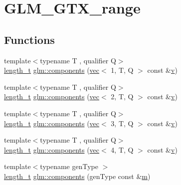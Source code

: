 \hypertarget{group__gtx__range}{}\section{G\+L\+M\+\_\+\+G\+T\+X\+\_\+range}
\label{group__gtx__range}
\subsection*{Functions}
\begin{DoxyCompactItemize}
\item 
{\footnotesize template$<$typename T , qualifier Q$>$ }\\\hyperlink{namespaceglm_a090a0de2260835bee80e71a702492ed9}{length\+\_\+t} \hyperlink{group__gtx__range_gaf2831875a8cee7cc000abadba2aa1265}{glm\+::components} (\hyperlink{structglm_1_1vec}{vec}$<$ 1, T, Q $>$ const \&\hyperlink{_s_d_l__opengl_8h_a10a82eabcb59d2fcd74acee063775f90}{v})
\item 
{\footnotesize template$<$typename T , qualifier Q$>$ }\\\hyperlink{namespaceglm_a090a0de2260835bee80e71a702492ed9}{length\+\_\+t} \hyperlink{group__gtx__range_ga30085e4904149502aac186e95d5604bf}{glm\+::components} (\hyperlink{structglm_1_1vec}{vec}$<$ 2, T, Q $>$ const \&\hyperlink{_s_d_l__opengl_8h_a10a82eabcb59d2fcd74acee063775f90}{v})
\item 
{\footnotesize template$<$typename T , qualifier Q$>$ }\\\hyperlink{namespaceglm_a090a0de2260835bee80e71a702492ed9}{length\+\_\+t} \hyperlink{group__gtx__range_gae7c3451f88f2550ed896da642cdbfd2d}{glm\+::components} (\hyperlink{structglm_1_1vec}{vec}$<$ 3, T, Q $>$ const \&\hyperlink{_s_d_l__opengl_8h_a10a82eabcb59d2fcd74acee063775f90}{v})
\item 
{\footnotesize template$<$typename T , qualifier Q$>$ }\\\hyperlink{namespaceglm_a090a0de2260835bee80e71a702492ed9}{length\+\_\+t} \hyperlink{group__gtx__range_ga6a306e940263c39ce05d378f68a7caff}{glm\+::components} (\hyperlink{structglm_1_1vec}{vec}$<$ 4, T, Q $>$ const \&\hyperlink{_s_d_l__opengl_8h_a10a82eabcb59d2fcd74acee063775f90}{v})
\item 
{\footnotesize template$<$typename gen\+Type $>$ }\\\hyperlink{namespaceglm_a090a0de2260835bee80e71a702492ed9}{length\+\_\+t} \hyperlink{group__gtx__range_ga946358ba868fc33d234e7ee3ac1b7912}{glm\+::components} (gen\+Type const \&\hyperlink{_s_d_l__opengl__glext_8h_af593500c283bf1a787a6f947f503a5c2}{m})

\end{DoxyCompactItemize}
